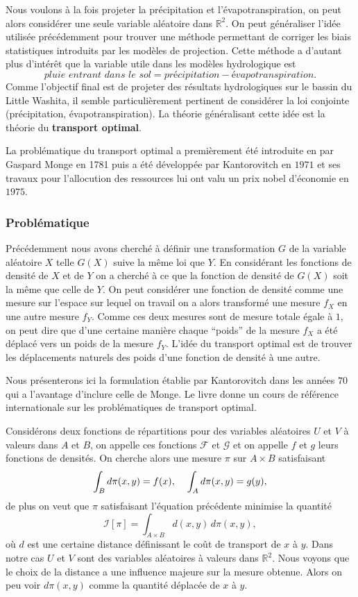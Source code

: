 \documentclass[a4paper,11pt]{article}
\begin{document}
Nous voulons à la fois projeter la précipitation et l'évapotranspiration, on peut alors considérer une seule variable aléatoire dans $\mathbb{R}^2$. On peut généraliser l'idée utilisée précédemment pour trouver une méthode permettant de corriger les biais statistiques introduits par les modèles de projection. Cette méthode a d'autant plus d'intérêt que la variable utile dans les modèles hydrologique est 
\[\textit{pluie entrant dans le sol}=\textit{précipitation}-\textit{évapotranspiration}.\]
Comme l'objectif final est de projeter des résultats hydrologiques sur le bassin du Little Washita, il semble particulièrement pertinent de considérer la loi conjointe (précipitation, évapotranspiration). La théorie généralisant cette idée est la théorie du \textbf{transport optimal}.

La problématique du transport optimal a premièrement été introduite en par Gaspard Monge en 1781 puis a été développée par Kantorovitch en $1971$ et ses travaux pour l'allocution des ressources lui ont valu un prix nobel d'économie en $1975$.

\subsubsection{Problématique}

Précédemment nous avons cherché à définir une transformation $G$ de la variable aléatoire $X$ telle $G(X)$ suive la même loi que $Y$. En considérant les fonctions de densité de $X$ et de $Y$ on a cherché à ce que la fonction de densité de $G(X)$ soit la même que celle de $Y$. On peut considérer une fonction de densité comme une mesure sur l'espace sur lequel on travail on a alors transformé une mesure $f_X$ en une autre mesure $f_Y$. Comme ces deux mesures sont de mesure totale égale à $1$, on peut dire que d'une certaine manière chaque ``poids'' de la mesure $f_X$ a été déplacé vers un poids de la mesure $f_Y$. L'idée du transport optimal est de trouver les déplacements naturels des poids d'une fonction de densité à une autre.  

Nous présenterons ici la formulation établie par Kantorovitch dans les années $70$ qui a l'avantage d'inclure celle de Monge. Le livre \cite{villani2003topics} donne un cours de référence internationale sur les problématiques de transport optimal. 

Considérons deux fonctions de répartitions pour des variables aléatoires $U$ et $V$ à valeurs dans $A$ et $B$, on appelle ces fonctions $\mathcal{F}$ et $\mathcal{G}$ et on appelle $f$ et $g$ leurs fonctions de densités. On cherche alors une mesure $\pi$ sur  $A \times B$ satisfaisant
\[\int_{B} d\pi(x,y)= f(x), \hspace{4mm} \int_{A}  d \pi(x,y)= g(y),\]
de plus on veut que $\pi$ satisfaisant l'équation précédente minimise la quantité
\[\mathcal{I}[\pi]=\int_{A \times B}d(x,y) \, d\pi(x,y),\]
où $d$ est une certaine distance définissant le coût de transport de $x$ à $y$. Dans notre cas $U$ et $V$ sont des variables aléatoires à valeurs dans $\mathbb{R}^2$. Nous voyons que le choix de la distance a une influence majeure sur la mesure obtenue. Alors on peu voir $d\pi(x,y)$ comme la quantité déplacée de $x$ à $y$.
\end{document}
